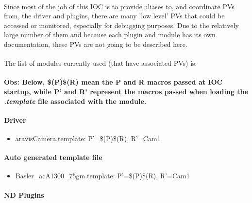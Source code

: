 \documentclass[openany]{article}
\begin{document}
        \paragraph{} Since most of the job of this IOC is to provide aliases to, and coordinate PVs from, the driver and plugins, there are many 'low level' PVs that could be accessed or monitored, especially for debugging purposes. Due to the relatively large number of them and because each plugin and module has its own documentation, these PVs are not going to be described here.

        \paragraph{} The list of modules currently used (that have associated PVs) is:

        \paragraph{Obs: Below, \$(P)\$(R) mean the P and R macros passed at IOC startup, while P' and R' represent the macros passed when loading the \emph{.template} file associated with the module.}

        \paragraph{Driver}

        \begin{itemize}
          \item aravisCamera.template: P'=\$(P)\$(R), R'=Cam1
        \end{itemize}

        \paragraph{Auto generated template file}

        \begin{itemize}
          \item Basler\_acA1300\_75gm.template: P'=\$(P)\$(R), R'=Cam1
        \end{itemize}

        \paragraph{ND Plugins}
\end{document}
